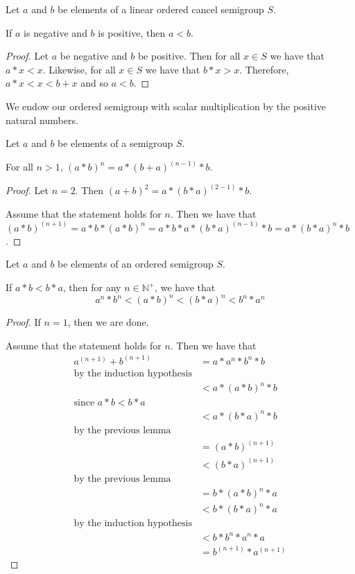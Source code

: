 \begin{theorem}\label{thm:neg_lt_pos}\leanok
{}
Let $a$ and $b$ be elements of a linear ordered cancel semigroup $S$.

If $a$ is negative and $b$ is positive, then $a < b$.
\end{theorem}
\begin{proof}
Let $a$ be negative and $b$ be positive. Then for all $x\in S$ we have that $a * x < x$.
Likewise, for all $x\in S$ we have that $b * x > x$.
Therefore, $a * x < x < b + x$ and so $a < b$.
\end{proof}

We endow our ordered semigroup with scalar multiplication by the positive natural numbers.

\begin{lemma}\label{split_first_and_last}\leanok
Let $a$ and $b$ be elements of a semigroup $S$.

For all $n > 1$, $(a*b)^n = a * (b+a)^(n-1) * b$.
\end{lemma}
\begin{proof}
Let $n=2$. Then $(a+b)^2 = a * (b*a)^(2-1) * b$.

Assume that the statement holds for $n$.
Then we have that $(a*b)^(n+1) = a * b * (a*b)^n = a * b * a * (b*a)^(n-1) * b = a * (b*a)^n * b$.
\end{proof}

\begin{lemma}\label{thm:comm_ineq}\leanok
Let $a$ and $b$ be elements of an ordered semigroup $S$.

If $a * b < b * a$, then for any $n\in \mathbb{N}^+$, we have that
\[a^n * b^n < (a*b)^n < (b*a)^n < b^n * a^n\]
\end{lemma}
\begin{proof}
If $n=1$, then we are done.

Assume that the statement holds for $n$.
Then we have that
\begin{align}
a^(n+1) + b^(n+1) &= a * a^n * b^n * b \\
\text{by the induction hypothesis}\\
&< a * (a * b)^n * b \\
\text{since $a*b < b*a$}\\
&< a * (b * a)^n * b \\
\text{by the previous lemma}\\
&= (a * b)^(n+1) \\
&< (b * a)^(n+1) \\
\text{by the previous lemma}\\
&= b * (a * b)^n * a \\
&< b * (b * a)^n * a \\
\text{by the induction hypothesis}\\
&< b * b^n * a^n * a \\
&= b^(n+1) * a^(n+1)
\end{align}
\end{proof}

